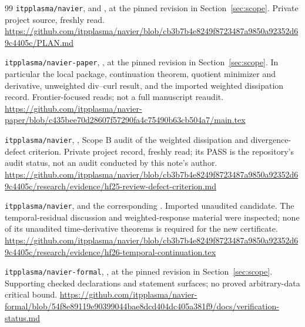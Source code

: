 \documentclass[11pt,a4paper]{article}
\theoremstyle{definition}\newtheorem{definition}[theorem]{Definition}
\theoremstyle{remark}\newtheorem{remark}[theorem]{Remark}
\newcommand{\repo}[1]{{\small\texttt{#1}}}
\numberwithin{equation}{section}
\begin{document}
\begin{thebibliography}{99}
 \repo{itpplasma/navier},  and , at the pinned revision in Section~\ref{sec:scope}. Private project source, freshly read.\newline
\url{https://github.com/itpplasma/navier/blob/cb3b7b4e8249f8723487a9850a92352d69c4405c/PLAN.md}

 \repo{itpplasma/navier-paper}, , at the pinned revision in Section~\ref{sec:scope}. In particular the local package, continuation theorem, quotient minimizer and derivative, unweighted div--curl result, and the imported weighted dissipation record. Frontier-focused reads; not a full manuscript reaudit.\newline
\url{https://github.com/itpplasma/navier-paper/blob/c435bee70d28607f57290fa4c75490b63cb504a7/main.tex}

 \repo{itpplasma/navier}, , Scope B audit of the weighted dissipation and divergence-defect criterion. Private project record, freshly read; its PASS is the repository's audit status, not an audit conducted by this note's author.\newline
\url{https://github.com/itpplasma/navier/blob/cb3b7b4e8249f8723487a9850a92352d69c4405c/research/evidence/hf25-review-defect-criterion.md}

 \repo{itpplasma/navier},  and the corresponding . Imported unaudited candidate. The temporal-residual discussion and weighted-response material were inspected; none of its unaudited time-derivative theorems is required for the new certificate.\newline
\url{https://github.com/itpplasma/navier/blob/cb3b7b4e8249f8723487a9850a92352d69c4405c/research/evidence/hf26-temporal-continuation.tex}

 \repo{itpplasma/navier-formal}, , at the pinned revision in Section~\ref{sec:scope}. Supporting checked declarations and statement surfaces; no proved arbitrary-data critical bound.\newline
\url{https://github.com/itpplasma/navier-formal/blob/54f8e89119e90399044bae8dcd404dc405a381f9/docs/verification-status.md}
\end{thebibliography}
\end{document}
